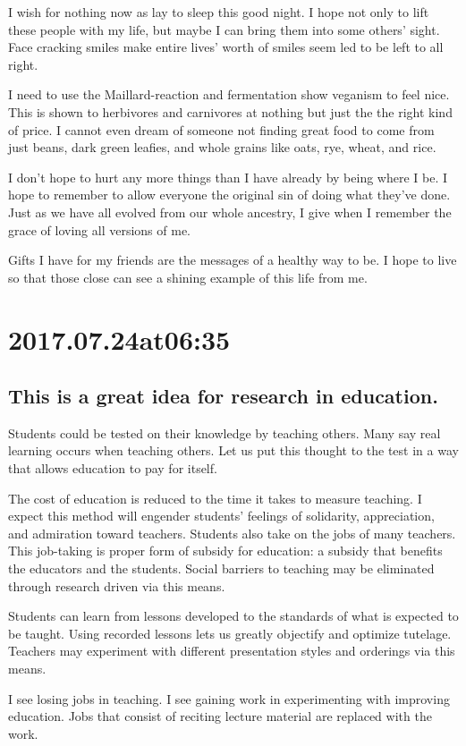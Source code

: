 \begin{enumerate}
\begin{enumerate}
I wish for nothing now as lay to sleep this good night. I hope not only to lift these people with my life, but maybe I can bring them into some others' sight. Face cracking smiles make entire lives' worth of smiles seem led to be left to all right.

I need to use the Maillard-reaction and fermentation show veganism to feel nice. This is shown to herbivores and carnivores at nothing but just the the right kind of price. I cannot even dream of someone not finding great food to come from just beans, dark green leafies, and whole grains like oats, rye, wheat, and rice.

I don't hope to hurt any more things than I have already by being where I be. I hope to remember to allow everyone the original sin of doing what they've done. Just as we have all evolved from our whole ancestry, I give when I remember the grace of loving all versions of me.

Gifts I have for my friends are the messages of a healthy way to be. I hope to live so that those close can see a shining example of this life from me.

\section*{ 2017.07.24at06:35 }
\subsection*{ This is a great idea for research in education. }
Students could be tested on their knowledge by teaching others. Many say real learning occurs when teaching others. Let us put this thought to the test in a way that allows education to pay for itself.

The cost of education is reduced to the time it takes to measure teaching. I expect this method will engender students' feelings of solidarity, appreciation, and admiration toward teachers. Students also take on the jobs of many teachers. This job-taking is proper form of subsidy for education: a subsidy that benefits the educators and the students. Social barriers to teaching may be eliminated through research driven via this means.

Students can learn from lessons developed to the standards of what is expected to be taught. Using recorded lessons lets us greatly objectify and optimize tutelage. Teachers may experiment with different presentation styles and orderings via this means.

I see losing jobs in teaching. I see gaining work in experimenting with improving education. Jobs that consist of reciting lecture material are replaced with the work.


\end{enumerate}
\end{enumerate}
